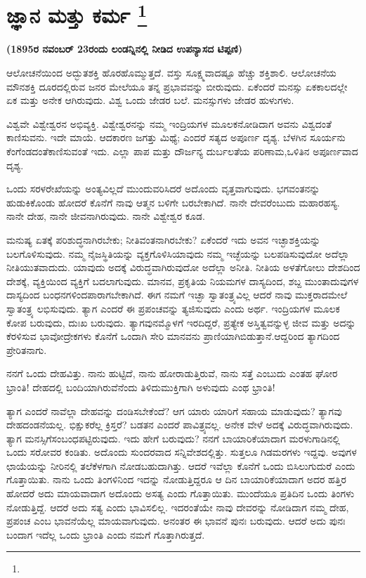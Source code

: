 
\vspace{-0.8cm}

\chapter[ಜ್ಞಾನ ಮತ್ತು ಕರ್ಮ ]{ಜ್ಞಾನ ಮತ್ತು ಕರ್ಮ \protect\footnote{}}

\centerline{\textbf{(1895ರ ನವಂಬರ್​ 23ರಂದು ಲಂಡನ್ನಿನಲ್ಲಿ ನೀಡಿದ ಉಪನ್ಯಾಸದ ಟಿಪ್ಪಣಿ)}}

\vskip 0.2cm

ಆಲೋಚನೆಯಿಂದ ಅದ್ಭುತಶಕ್ತಿ ಹೊರಹೊಮ್ಮುತ್ತದೆ. ವಸ್ತು ಸೂಕ್ಷ್ಮವಾದಷ್ಟೂ ಹೆಚ್ಚು ಶಕ್ತಿಶಾಲಿ. ಆಲೋಚನೆಯ ಮೌನಶಕ್ತಿ ದೂರದಲ್ಲಿರುವ ಜನರ ಮೇಲೆಯೂ ತನ್ನ ಪ್ರಭಾವವನ್ನು ಬೀರುವುದು. ಏಕೆಂದರೆ ಮನಸ್ಸು ಏಕಕಾಲದಲ್ಲೇ ಏಕ ಮತ್ತು ಅನೇಕ ಆಗಿರುವುದು. ವಿಶ್ವ ಒಂದು ಜೇಡರ ಬಲೆ. ಮನಸ್ಸುಗಳು ಜೇಡರ ಹುಳುಗಳು.

ವಿಶ್ವವೇ ವಿಶ್ವೇಶ್ವರನ ಅಭಿವ್ಯಕ್ತಿ. ವಿಶ್ವೇಶ್ವರನನ್ನು ನಮ್ಮ ಇಂದ್ರಿಯಗಳ ಮೂಲಕ\break ನೋಡಿದಾಗ ಅವನು ವಿಶ್ವದಂತೆ ಕಾಣಿಸುವನು. ಇದೇ ಮಾಯೆ. ಆದಕಾರಣ ಜಗತ್ತು ಮಿಥ್ಯೆ; ಎಂದರೆ ಸತ್ಯದ ಅಪೂರ್ಣ ದೃಶ್ಯ. ಬೆಳಗಿನ ಸೂರ್ಯನು ಕೆಂಗೆಂಡದಂತೆ\break ಕಾಣಿಸುವಂತೆ ಇದು. ಎಲ್ಲಾ ಪಾಪ ಮತ್ತು ದೌರ್ಜನ್ಯ ದುರ್ಬಲತೆಯ ಪರಿಣಾಮ,\break ಒಳಿತಿನ ಅಪೂರ್ಣವಾದ ದೃಶ್ಯ.

ಒಂದು ಸರಳರೇಖೆಯನ್ನು ಅಂತ್ಯವಿಲ್ಲದೆ ಮುಂದುವರಿಸಿದರೆ ಅದೊಂದು ವೃತ್ತವಾಗುವುದು. ಭಗವಂತನನ್ನು ಹುಡುಕಿಕೊಂಡು ಹೋದರೆ ಕೊನೆಗೆ ನಾವು ಆತ್ಮನ ಬಳಿಗೇ ಬರಬೇಕಾಗಿದೆ. ನಾನೇ ದೇವರೆಂಬುದು ಮಹಾರಹಸ್ಯ. ನಾನೇ ದೇಹ, ನಾನೇ ಜೀವನಾಗಿರುವುದು. ನಾನೇ ವಿಶ್ವೇಶ್ವರ ಕೂಡ.

ಮನುಷ್ಯ ಏತಕ್ಕೆ ಪರಿಶುದ್ಧನಾಗಿರಬೇಕು; ನೀತಿವಂತನಾಗಿರಬೇಕು? ಏಕೆಂದರೆ ಇದು ಅವನ ಇಚ್ಛಾಶಕ್ತಿಯನ್ನು ಬಲಗೊಳಿಸುವುದು. ನಮ್ಮ ನೈಜಸ್ಥಿತಿಯನ್ನು ವ್ಯಕ್ತಗೊಳಿಸಿ\break ಯಾವುದು ನಮ್ಮ ಇಚ್ಛೆಯನ್ನು ಬಲಪಡಿಸುವುದೋ ಅದೆಲ್ಲಾ ನೀತಿಯುತವಾದುದು. ಯಾವುದು ಅದಕ್ಕೆ ವಿರುದ್ಧವಾಗಿರುವುದೋ ಅದೆಲ್ಲಾ ಅನೀತಿ. ನೀತಿಯ ಅಳತೆಗೋಲು ದೇಶದಿಂದ ದೇಶಕ್ಕೆ, ವ್ಯಕ್ತಿಯಿಂದ ವ್ಯಕ್ತಿಗೆ ಬದಲಾಗುವುದು. ಮಾನವ, ಪ್ರಕೃತಿಯ ನಿಯಮಗಳ ದಾಸ್ಯದಿಂದ, ಶಬ್ದ ಮುಂತಾದುವುಗಳ ದಾಸ್ಯದಿಂದ ಬಂಧನಗಳಿಂದ\break ಪಾರಾಗಬೇಕಾಗಿದೆ. ಈಗ ನಮಗೆ ಇಚ್ಛಾ ಸ್ವಾತಂತ್ರ್ಯವಿಲ್ಲ ಆದರೆ ನಾವು ಮುಕ್ತರಾದ\break ಮೇಲೆ ಸ್ವಾತಂತ್ರ್ಯ ಲಭಿಸುವುದು. ತ್ಯಾಗ ಎಂದರೆ ಈ ಪ್ರಪಂಚವನ್ನು ತ್ಯಜಿಸುವುದು ಎಂದು ಅರ್ಥ. ಇಂದ್ರಿಯಗಳ ಮೂಲಕ ಕೋಪ ಬರುವುದು, ದುಃಖ ಬರುವುದು. ತ್ಯಾಗವು\break ನಮ್ಮೊಳಗೆ ಇರದಿದ್ದರೆ, ಪ್ರತ್ಯೇಕ ಅಸ್ತಿತ್ವವನ್ನುಳ್ಳ ಜೀವ ಮತ್ತು ಅದನ್ನು ಕೆರಳಿಸುವ ಭಾವೋದ್ರೇಕಗಳು ಕೊನೆಗೆ ಒಂದಾಗಿ ಸೇರಿ ಮಾನವನು ಪ್ರಾಣಿಯಾಗಿಬಿಡುತ್ತಾನೆ.\break ಆದ್ದರಿಂದ ತ್ಯಾಗದಿಂದ ಪ್ರೇರಿತನಾಗು.

ನನಗೆ ಒಂದು ದೇಹವಿತ್ತು. ನಾನು ಹುಟ್ಟಿದೆ, ನಾನು ಹೋರಾಡುತ್ತಿರುವೆ, ನಾನು ಸತ್ತೆ ಎಂಬುದು ಎಂತಹ ಘೋರ ಭ್ರಾಂತಿ! ದೇಹದಲ್ಲಿ ಬಂದಿಯಾಗಿರುವೆನೆಂದು ತಿಳಿದು\break ಮುಕ್ತಿಗಾಗಿ ಅಳುವುದು ಎಂಥ ಭ್ರಾಂತಿ!

ತ್ಯಾಗ ಎಂದರೆ ನಾವೆಲ್ಲಾ ದೇಹವನ್ನು ದಂಡಿಸಬೇಕೆಂದೆ? ಆಗ ಯಾರು ಯಾರಿಗೆ ಸಹಾಯ ಮಾಡುವುದು? ತ್ಯಾಗವು ದೇಹದಂಡನೆಯಲ್ಲ. ಭಿಕ್ಷುಕರೆಲ್ಲ ಕ್ರಿಸ್ತರೆ? ಬಡತನ ಎಂದರೆ ಪಾವಿತ್ರ್ಯವಲ್ಲ. ಅನೇಕ ವೇಳೆ ಅದಕ್ಕೆ ವಿರುದ್ಧವಾಗಿರುವುದು. ತ್ಯಾಗ ಮನಸ್ಸಿಗೆ\break ಸಂಬಂಧಪಟ್ಟಿರುವುದು. ಇದು ಹೇಗೆ ಬರುವುದು? ನನಗೆ ಬಾಯಾರಿಕೆಯಾದಾಗ ಮರಳು\-ಗಾಡಿನಲ್ಲಿ ಒಂದು ಸರೋವರ ಕಂಡಿತು. ಅದೊಂದು ಸುಂದರವಾದ ಸನ್ನಿವೇಶದಲ್ಲಿತ್ತು. ಸುತ್ತಲೂ ಗಿಡಮರಗಳು ಇದ್ದವು. ಅವುಗಳ ಛಾಯೆಯನ್ನು ನೀರಿನಲ್ಲಿ ತಲೆಕೆಳಗಾಗಿ ನೋಡ\-ಬಹುದಾಗಿತ್ತು. ಆದರೆ ಇವೆಲ್ಲಾ ಕೊನೆಗೆ ಒಂದು ಬಿಸಿಲುಗುದುರೆ ಎಂದು ಗೊತ್ತಾಯಿತು. ನಾನು ಒಂದು ತಿಂಗಳಿನಿಂದ ಇದನ್ನು ನೋಡುತ್ತಿದ್ದರೂ ಆ ದಿನ ಬಾಯಾರಿಕೆಯಾದಾಗ ಅದರ ಹತ್ತಿರ ಹೋದರೆ ಅದು ಮಾಯವಾದಾಗ ಅದೊಂದು ಅಸತ್ಯ ಎಂದು ಗೊತ್ತಾಯಿತು. ಮುಂದೆಯೂ ಪ್ರತಿದಿನ ಒಂದು ತಿಂಗಳು ನೋಡುತ್ತಿದ್ದೆ. ಆದರೆ ಅದು ಸತ್ಯ ಎಂದು ಭಾವಿಸಲಿಲ್ಲ. ಇದರಂತೆಯೇ ನಾವು ದೇವರನ್ನು ನೋಡಿದಾಗ ನಮ್ಮ ದೇಹ, ಪ್ರಪಂಚ ಎಂಬ ಭಾವನೆಯೆಲ್ಲ ಮಾಯವಾಗುವುದು. ಅನಂತರ ಈ ಭಾವನೆ ಪುನಃ ಬರುವುದು. ಆದರೆ ಅದು ಪುನಃ ಬಂದಾಗ ಇದೆಲ್ಲ ಒಂದು ಭ್ರಾಂತಿ ಎಂದು ನಮಗೆ ಗೊತ್ತಾಗಿರುತ್ತದೆ.

